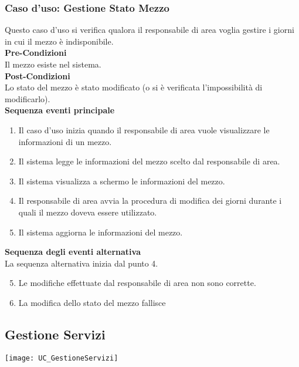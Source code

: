 \documentclass[green, fancy, 11pt]{elegantbook}
\begin{document}
\subsubsection{Caso d'uso: Gestione Stato Mezzo}
\noindent
Questo caso d’uso si verifica qualora il responsabile di area voglia gestire i giorni in cui il mezzo è indisponibile.\\
\textbf{Pre-Condizioni}\\
Il mezzo esiste nel sistema.\\
\textbf{Post-Condizioni}\\
Lo stato del mezzo è stato modificato (o si è verificata l’impossibilità di modificarlo).\\
\textbf{Sequenza eventi principale}
\begin{enumerate}
	\item Il caso d’uso inizia quando il responsabile di area vuole visualizzare le informazioni di un mezzo.
	\item Il sistema legge le informazioni del mezzo scelto dal responsabile di area.
	\item Il sistema visualizza a schermo le informazioni del mezzo.
	\item Il responsabile di area avvia la procedura di modifica dei giorni durante i quali il mezzo doveva essere utilizzato.
	\item Il sistema aggiorna le informazioni del mezzo.
\end{enumerate}
\textbf{Sequenza degli eventi alternativa}\\
La sequenza alternativa inizia dal punto 4.
\begin{enumerate}
	\setcounter{enumi}{4}
	\item Le modifiche effettuate dal responsabile di area non sono corrette.
	\item La modifica dello stato del mezzo fallisce
\end{enumerate}
\newpage

\subsection{Gestione Servizi}
\texttt{[image: UC\_GestioneServizi]}
\end{document}

